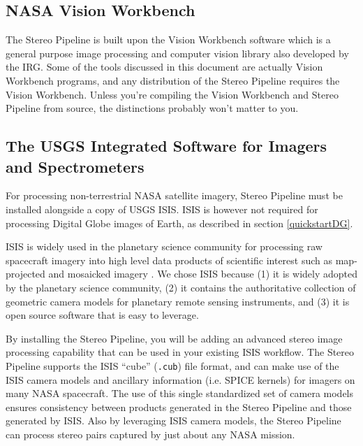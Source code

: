 \subsection{NASA Vision Workbench}

The Stereo Pipeline is built upon the Vision Workbench software
which is a general purpose image processing and computer vision
library also developed by the \ac{IRG}.  Some of the tools discussed
in this document are actually Vision Workbench programs, and any
distribution of the Stereo Pipeline requires the Vision Workbench.
Unless you're compiling the Vision Workbench and Stereo Pipeline from
source, the distinctions probably won't matter to you.


\subsection{The USGS Integrated Software for Imagers and Spectrometers}

For processing non-terrestrial NASA satellite imagery, Stereo Pipeline
must be installed alongside a copy of \ac{USGS} \ac{ISIS}. \ac{ISIS} is
however not required for processing Digital Globe images of Earth, as
described in section \ref{quickstartDG}.

\ac{ISIS} is widely used in the planetary science community
for processing raw spacecraft imagery into high level data products of
scientific interest such as map-projected and mosaicked imagery
\cite{2004LPI....35.2039A, 1997LPI....28..387G, ISIS_website}.  We
chose \ac{ISIS} because (1) it is widely adopted by the planetary
science community, (2) it contains the authoritative collection of
geometric camera models for planetary remote sensing instruments, and
(3) it is open source software that is easy to leverage.

By installing the Stereo Pipeline, you will be adding an advanced
stereo image processing capability that can be used in your existing
\ac{ISIS} workflow.  The Stereo Pipeline supports the \ac{ISIS}
``cube'' (\texttt{.cub}) file format, and can make use of the \ac{ISIS}
camera models and ancillary information (i.e. SPICE kernels) for
imagers on many \ac{NASA} spacecraft.  The use of this single standardized
set of camera models ensures consistency between products generated
in the Stereo Pipeline and those generated by \ac{ISIS}.  Also by
leveraging \ac{ISIS} camera models, the Stereo Pipeline can process
stereo pairs captured by just about any \ac{NASA} mission.


%
%
%
%

